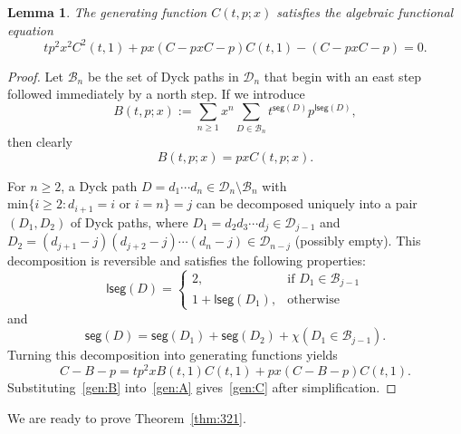 \documentclass[12pt]{amsart}
\numberwithin{equation}{section}
\theoremstyle{plain}
\newtheorem{lemma}[theorem]{Lemma}
\theoremstyle{definition}
\def\lseg{\mathsf{lseg}}
\def\seg{\mathsf{seg}}
\def\min{\mathrm{min}}
\begin{document}
\begin{lemma}\label{decom:dyck}
The generating function $C(t,p;x)$ satisfies the algebraic functional equation
\begin{equation}\label{gen:C}
tp^2x^2C^2(t,1)+px(C-pxC-p)C(t,1)-(C-pxC-p)=0.
\end{equation}
\end{lemma}
\begin{proof}
Let $\mathcal{B}_n$ be the set of Dyck paths in $\mathcal{D}_n$ that begin with an east step followed immediately by a north step. If we introduce 
$$
B(t,p;x):=\sum_{n\geq1}x^n\sum_{D\in\mathcal{B}_n}t^{\seg(D)}p^{\lseg(D)},
$$
then clearly 
\begin{equation}\label{gen:B}
B(t,p;x)=pxC(t,p;x).
\end{equation}

For $n\geq2$, a Dyck path $D=d_1\cdots d_n\in\mathcal{D}_n\setminus\mathcal{B}_n$  with $\min\{i\geq2: d_{i+1}=i\text{ or $i=n$}\}=j$ can be decomposed uniquely into a pair $(D_1,D_2)$  of Dyck paths, where $D_1=d_2d_3\cdots d_j\in\mathcal{D}_{j-1}$ and $D_2=(d_{j+1}-j)(d_{j+2}-j)\cdots(d_n-j)\in\mathcal{D}_{n-j}$ (possibly empty). This decomposition is reversible and satisfies the following properties: 
$$
\lseg(D)=
\begin{cases}
2,\quad&\text{if $D_1\in\mathcal{B}_{j-1}$}\\
1+\lseg(D_1), &\text{otherwise}
\end{cases}
$$
and
$$
\seg(D)=\seg(D_1)+\seg(D_2)+\chi(D_1\in\mathcal{B}_{j-1}).
$$
Turning this decomposition into generating functions yields 
\begin{equation}\label{gen:A}
C-B-p=tp^2xB(t,1)C(t,1)+px(C-B-p)C(t,1).
\end{equation}
Substituting~\eqref{gen:B} into~\eqref{gen:A} gives~\eqref{gen:C} after simplification. 
\end{proof}

We are ready to prove Theorem~\ref{thm:321}.
\end{document}
